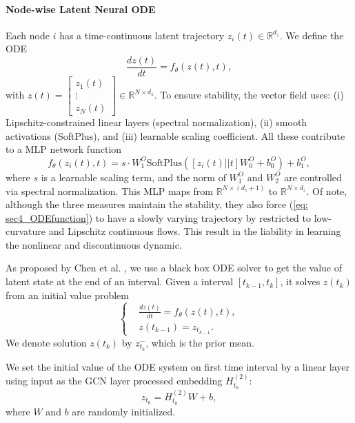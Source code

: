 \paragraph{Node-wise Latent Neural ODE}

Each node $i$ has a time-continuous latent trajectory $z_i(t)\in\mathbb{R}^{d_z}$.
We define the ODE
\begin{equation*}
    \frac{dz(t)}{dt} = f_\theta(z(t),t),
\end{equation*}
with $z(t)=\begin{bmatrix}
    z_1(t) \\
    \vdots \\
    z_N(t)\end{bmatrix} \in \mathbb{R}^{N\times d_z}$.
To ensure stability, the vector field uses:
(i) Lipschitz-constrained linear layers (spectral normalization),
(ii) smooth activations (SoftPlus), and
(iii) learnable scaling coefficient. 
All these contribute to a MLP network function 
\begin{equation}
    \label{eq: sec4_ODEfunction}
    f_\theta(z_i(t),t) =s \cdot W^O_1\mathrm{SoftPlus}\left([z_i(t)||t]W^O_0+b^O_0\right)+b^O_1,
\end{equation}
where $s$ is a learnable scaling term, and the norm of $W^O_1$ and $W^O_2$ are controlled via spectral normalization. 
This MLP maps from $\mathbb{R}^{N\times(d_z+1)}$ to $\mathbb{R}^{N\times d_z}$. 
Of note, although the three measures maintain the stability, 
they also force (\ref{eq: sec4_ODEfunction}) to have a slowly varying trajectory by restricted to low-curvature and Lipschitz continuous flows. 
This result in the liability in learning the nonlinear and discontinuous dynamic. 

As proposed by Chen et al. \cite{chen2019neuralordinarydifferentialequations}, 
we use a black box ODE solver to get the value of latent state at the end of an interval. 
Given a interval $[t_{k-1},t_k]$, it solves $z(t_k)$ from an initial value problem 
\begin{equation*}
    \left\{\begin{aligned}
        &\frac{dz(t)}{dt} = f_{\theta}(z(t),t), \\
        &z(t_{k-1}) = z_{t_{k-1}}.
    \end{aligned}\right.
\end{equation*}
We denote solution $z(t_k)$ by $z_{t_k}^-$, which is the prior mean. 

We set the initial value of the ODE system on first time interval by a linear layer using input as the GCN layer processed embedding $H^{(2)}_{t_0}$:
\begin{equation*}
    z_{t_0} = H^{(2)}_{t_0}W + b, 
\end{equation*}
where $W$ and $b$ are randomly initialized. 

